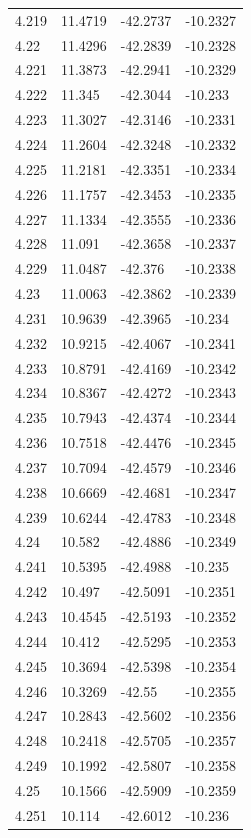 \begin{tabular}{llll}
4.219 & 11.4719 & -42.2737 & -10.2327 \\
4.22 & 11.4296 & -42.2839 & -10.2328 \\
4.221 & 11.3873 & -42.2941 & -10.2329 \\
4.222 & 11.345 & -42.3044 & -10.233 \\
4.223 & 11.3027 & -42.3146 & -10.2331 \\
4.224 & 11.2604 & -42.3248 & -10.2332 \\
4.225 & 11.2181 & -42.3351 & -10.2334 \\
4.226 & 11.1757 & -42.3453 & -10.2335 \\
4.227 & 11.1334 & -42.3555 & -10.2336 \\
4.228 & 11.091 & -42.3658 & -10.2337 \\
4.229 & 11.0487 & -42.376 & -10.2338 \\
4.23 & 11.0063 & -42.3862 & -10.2339 \\
4.231 & 10.9639 & -42.3965 & -10.234 \\
4.232 & 10.9215 & -42.4067 & -10.2341 \\
4.233 & 10.8791 & -42.4169 & -10.2342 \\
4.234 & 10.8367 & -42.4272 & -10.2343 \\
4.235 & 10.7943 & -42.4374 & -10.2344 \\
4.236 & 10.7518 & -42.4476 & -10.2345 \\
4.237 & 10.7094 & -42.4579 & -10.2346 \\
4.238 & 10.6669 & -42.4681 & -10.2347 \\
4.239 & 10.6244 & -42.4783 & -10.2348 \\
4.24 & 10.582 & -42.4886 & -10.2349 \\
4.241 & 10.5395 & -42.4988 & -10.235 \\
4.242 & 10.497 & -42.5091 & -10.2351 \\
4.243 & 10.4545 & -42.5193 & -10.2352 \\
4.244 & 10.412 & -42.5295 & -10.2353 \\
4.245 & 10.3694 & -42.5398 & -10.2354 \\
4.246 & 10.3269 & -42.55 & -10.2355 \\
4.247 & 10.2843 & -42.5602 & -10.2356 \\
4.248 & 10.2418 & -42.5705 & -10.2357 \\
4.249 & 10.1992 & -42.5807 & -10.2358 \\
4.25 & 10.1566 & -42.5909 & -10.2359 \\
4.251 & 10.114 & -42.6012 & -10.236 \\

\end{tabular}
